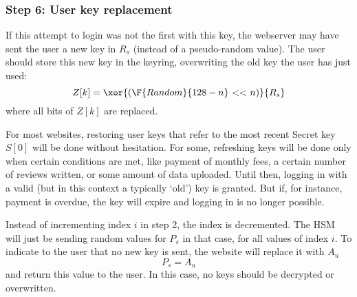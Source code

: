\subsubsection{Step 6: User key replacement}
\label{sec:login_step6}
\label{sec:conditional_key_replacement}
If this attempt to login was not the first with this key,
the webserver may have sent the user a new key in $R_s$ (instead of a pseudo-random value).
The user should store this new key in the keyring, overwriting the old key the user has just used:
\[Z[k]=\xor{(\F{Random}{128-n}\ \mathbf{<<}\ n)}{R_s}\]
where all bits of $Z[k]$ are replaced.
\par
For most websites,
restoring user keys that refer to the most recent Secret key $S[0]$ will be done without hesitation.
For some,
refreshing keys will be done only when certain conditions are met,
like payment of monthly fees,
a certain number of reviews written,
or some amount of data uploaded.
Until then,
logging in with a valid
(but in this context a typically `old')
key is granted.
But if, for instance, payment is overdue, the key will expire and logging in is no longer possible.
\par
Instead of incrementing index $i$ in step 2,
the index is decremented.
The HSM will just be sending random values for $P_s$ in that case, for all values of index $i$.
To indicate to the user that no new key is sent,
the website will replace it with $A_u$
\[P_s = A_u\]
and return this value to the user.
In this case,
no keys should be decrypted or overwritten.

